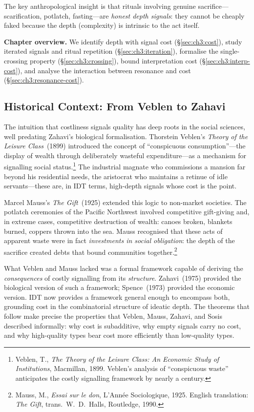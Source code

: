 The key anthropological insight is that rituals involving genuine
sacrifice---scarification, potlatch, fasting---are \emph{honest depth
signals}: they cannot be cheaply faked because the depth (complexity) is
intrinsic to the act itself.

\medskip
\noindent\textbf{Chapter overview.}  We identify depth with signal cost
(\S\ref{sec:ch3:cost}), study iterated signals and ritual repetition
(\S\ref{sec:ch3:iteration}), formalise the single-crossing property
(\S\ref{sec:ch3:crossing}), bound interpretation cost
(\S\ref{sec:ch3:interp-cost}), and analyse the interaction between
resonance and cost (\S\ref{sec:ch3:resonance-cost}).

\subsection*{Historical Context: From Veblen to Zahavi}

The intuition that costliness signals quality has deep roots in the
social sciences, well predating Zahavi's biological formalisation.
Thorstein Veblen's \textit{Theory of the Leisure Class}~(1899)
introduced the concept of ``conspicuous consumption''---the display of
wealth through deliberately wasteful expenditure---as a mechanism for
signalling social status.\footnote{Veblen, T., \textit{The Theory of
  the Leisure Class: An Economic Study of Institutions}, Macmillan,
  1899.  Veblen's analysis of ``conspicuous waste'' anticipates the
  costly signalling framework by nearly a century.}  The industrial
magnate who commissions a mansion far beyond his residential needs, the
aristocrat who maintains a retinue of idle servants---these are,
in IDT terms, high-depth signals whose cost is the point.

Marcel Mauss's \textit{The Gift}~(1925) extended this logic to
non-market societies.  The potlatch ceremonies of the Pacific Northwest
involved competitive gift-giving and, in extreme cases, competitive
destruction of wealth: canoes broken, blankets burned, coppers thrown
into the sea.  Mauss recognised that these acts of apparent waste were
in fact \emph{investments in social obligation}: the depth of the
sacrifice created debts that bound communities
together.\footnote{Mauss, M., \textit{Essai sur le don}, L'Ann\'{e}e
  Sociologique, 1925.  English translation: \textit{The Gift}, trans.\
  W.~D.~Halls, Routledge, 1990.}

What Veblen and Mauss lacked was a formal framework capable of deriving
the \emph{consequences} of costly signalling from its
\emph{structure}.  Zahavi~(1975) provided the biological version of
such a framework; Spence~(1973) provided the economic version.  IDT
now provides a framework general enough to encompass both, grounding
cost in the combinatorial structure of ideatic depth.  The theorems that
follow make precise the properties that Veblen, Mauss, Zahavi, and
Sosis described informally: why cost is subadditive, why empty signals
carry no cost, and why high-quality types bear cost more
efficiently than low-quality types.


